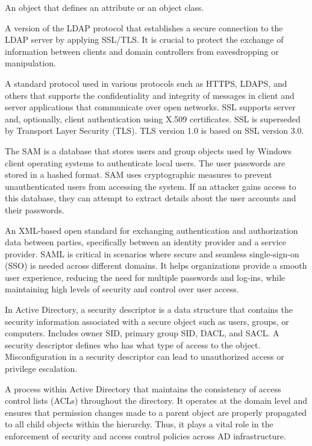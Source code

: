  An object that defines an attribute or an object class.

 A version of the LDAP protocol that establishes a secure connection to the LDAP server by applying SSL/TLS. It is crucial to protect the exchange of information between clients and domain controllers from eavesdropping or manipulation.

 A standard protocol used in various protocols such as HTTPS, LDAPS, and others that supports the confidentiality and integrity of messages in client and server applications that communicate over open networks. SSL supports server and, optionally, client authentication using X.509 certificates. SSL is superseded by Transport Layer Security (TLS). TLS version 1.0 is based on SSL version 3.0.

 The SAM is a database that stores users and group objects used by Windows client operating systems to authenticate local users. The user passwords are stored in a hashed format. SAM uses cryptographic measures to prevent unauthenticated users from accessing the system. If an attacker gains access to this database, they can attempt to extract details about the user accounts and their passwords.

 An XML-based open standard for exchanging authentication and authorization data between parties, specifically between an identity provider and a service provider. SAML is critical in scenarios where secure and seamless single-sign-on (SSO) is needed across different domains. It helps organizations provide a smooth user experience, reducing the need for multiple passwords and log-ins, while maintaining high levels of security and control over user access.

 In Active Directory, a security descriptor is a data structure that contains the security information associated with a secure object such as users, groups, or computers. Includes owner SID, primary group SID, DACL, and SACL. A security descriptor defines who has what type of access to the object. Misconfiguration in a security descriptor can lead to unauthorized access or privilege escalation.

 A process within Active Directory that maintains the consistency of access control lists (ACLs) throughout the directory. It operates at the domain level and ensures that permission changes made to a parent object are properly propagated to all child objects within the hierarchy. Thus, it plays a vital role in the enforcement of security and access control policies across AD infrastructure.


